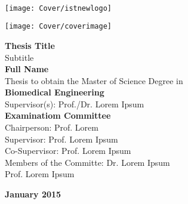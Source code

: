 \setcounter{page}{1} 


\thispagestyle{empty}
\begin{flushleft} ~\\ \vspace{-12mm} \hspace{-12mm}  \texttt{[image: Cover/istnewlogo]} 
\vspace{10mm}
\\ \begin{center} \texttt{[image: Cover/coverimage]}  \end{center} %
 \vspace{5mm}
\centering
\LARGE \textbf{Thesis Title}
\\ \vspace{10mm}
\Large Subtitle
\\ \vspace{15mm}
\Large \textbf{Full Name} \\
\vspace{12mm}
\large Thesis to obtain the Master of Science Degree in
\\ \vspace{2mm}
\LARGE \textbf{Biomedical Engineering}
\\ \vspace{10mm}
\large Supervisor(s): Prof./Dr. Lorem Ipsum
\\ \vspace{15mm}
\Large \textbf{Examinatiom Committee}
\\ \vspace{5mm}
\large Chairperson:	Prof. Lorem \\
\large Supervisor: Prof. Lorem Ipsum\\
\large Co-Supervisor: Prof. Lorem Ipsum \\
\large Members of the Committe: Dr. Lorem Ipsum \\
Prof. Lorem Ipsum
 
\vspace{15mm}

\Large \textbf{January 2015} \\
\let\thepage\relax
\end{flushleft}
\pagebreak


\clearpage

\thispagestyle{empty}
\cleardoublepage

\setcounter{page}{1} 

\baselineskip 18pt %
